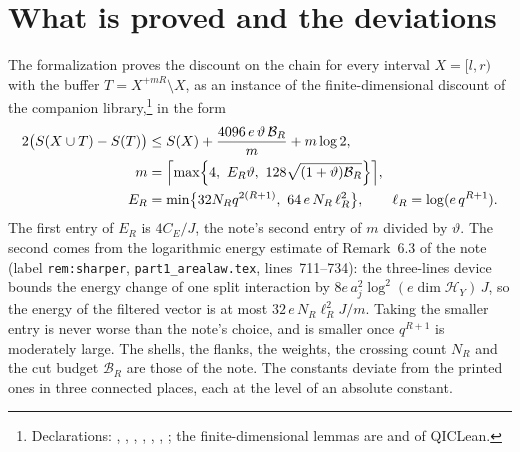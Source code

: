 \documentclass{article}
\begin{document}
\section{What is proved and the deviations}

The formalization proves the discount on the chain for every interval
$X=[l,r)$ with the buffer $T=X^{+mR}\setminus X$, as an instance of the
finite-dimensional discount of the companion library,\footnote{Declarations:
    ,
    ,
    ,
    ,
    ,
    ,
    ; the
    finite-dimensional lemmas are 
    and  of QICLean.} in the form
\begin{align}
    2\bigl(S(X\cup T)-S(T)\bigr)
     & \le S(X)+\frac{4096\,e\,\vartheta\,\mathcal B_R}{m}+m\log2,
    \label{eq:tnlean_one_dimensional_discount_constants_formal_discount}                                  \\
    m
     & = \Bigl\lceil\max\Bigl\{4,\ E_R\vartheta,\ 128\sqrt{(1+\vartheta)\mathcal B_R}\Bigr\}\Bigr\rceil ,
    \label{eq:tnlean_one_dimensional_discount_constants_formal_shell_count}                               \\
    E_R
     & = \min\bigl\{32N_Rq^{2(R+1)},\ 64\,e\,N_R\,\ell_R^2\bigr\},
    \qquad \ell_R=\log(e\,q^{R+1}).
    \label{eq:tnlean_one_dimensional_discount_constants_formal_energy_constant}
\end{align}
The first entry of $E_R$ is $4C_E/J$, the note's second entry of $m$ divided
by $\vartheta$. The second comes from the logarithmic energy estimate of
Remark~6.3 of the note (label \texttt{rem:sharper}, \texttt{part1\_arealaw.tex},
lines~711--734): the three-lines device bounds the energy change of one split
interaction by $8e\,a_j^2\log^2(e\dim\mathcal H_Y)\,J$, so the energy of the
filtered vector is at most $32\,e\,N_R\ell_R^2J/m$. Taking the smaller entry
is never worse than the note's choice, and is smaller once $q^{R+1}$ is
moderately large.
The shells, the flanks, the weights, the crossing count $N_R$ and the cut
budget $\mathcal B_R$ are those of the note. The constants deviate from the
printed ones in three connected places, each at the level of an absolute
constant.
\end{document}
